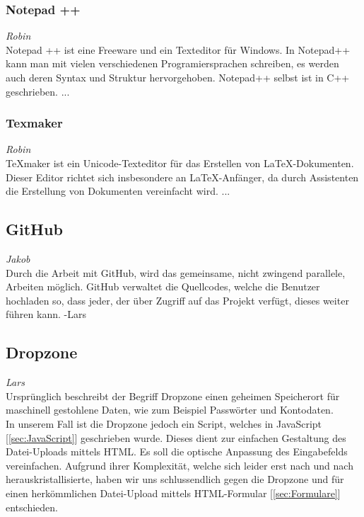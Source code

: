 \documentclass[12pt,a4paper,bibliography=totocnumbered,listof=totocnumbered]{scrartcl}
\begin{document}
\subsubsection{Notepad ++}
\label{sec:Notepad++}
\emph{Robin}\\
Notepad ++ ist eine Freeware und ein Texteditor für Windows. In Notepad++ kann man mit vielen verschiedenen Programiersprachen schreiben, es werden auch deren Syntax und Struktur hervorgehoben. Notepad++ selbst ist in C++ geschrieben. \cite{Notepad}
...

\subsubsection{Texmaker}
\label{sec:Texmaker}
\emph{Robin}\\
TeXmaker ist ein Unicode-Texteditor für das Erstellen von LaTeX-Dokumenten. Dieser Editor richtet sich insbesondere an LaTeX-Anfänger, da durch Assistenten die Erstellung von Dokumenten vereinfacht wird. \cite{Texmaker}
...

\subsection{GitHub}
\label{sec:GitHub}
\emph{Jakob}\\
Durch die Arbeit mit GitHub, wird das gemeinsame, nicht zwingend parallele, Arbeiten möglich. GitHub verwaltet die Quellcodes, welche die Benutzer hochladen so, dass jeder, der über Zugriff auf das Projekt verfügt, dieses weiter führen kann. -Lars

\subsection{Dropzone}
\label{sec:Dropzone}
\emph{Lars}\\
Ursprünglich beschreibt der Begriff \glqq Dropzone\grqq{} einen geheimen Speicherort für maschinell gestohlene Daten, wie zum Beispiel Passwörter und Kontodaten.\cite{wiki/Dropzone} \\
In unserem Fall ist die Dropzone jedoch ein Script, welches in JavaScript [\ref{sec:JavaScript}] geschrieben wurde. Dieses dient zur einfachen Gestaltung des Datei-Uploads mittels HTML. Es soll die optische Anpassung des Eingabefelds vereinfachen. 
Aufgrund ihrer Komplexität, welche sich leider erst nach und nach herauskristallisierte, haben wir uns schlussendlich gegen die Dropzone und für einen herkömmlichen Datei-Upload mittels HTML-Formular [\ref{sec:Formulare}] entschieden.
\end{document}
